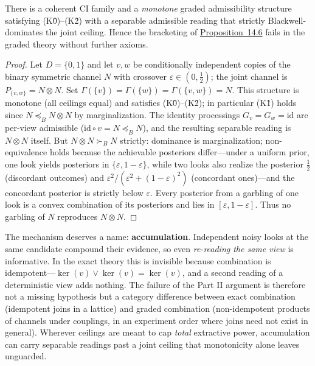 \begin{thmplain}

There is a coherent CI family and a \emph{monotone} graded admissibility structure satisfying (K0̂)--(K2̂) with a separable admissible reading that strictly Blackwell-dominates the joint ceiling. Hence the bracketing of \hyperlink{stmt:14.6}{Proposition~14.6} fails in the graded theory without further axioms.
\end{thmplain}

\begin{proof}

Let \(D = \{0,1\}\) and let \(v, w\) be conditionally independent copies of the binary symmetric channel \(N\) with crossover \(\varepsilon \in (0, \tfrac12)\); the joint channel is \(P_{\{v,w\}} = N \otimes N\). Set \(\Gamma(\{v\}) = \Gamma(\{w\}) = \Gamma(\{v,w\}) = N\). This structure is monotone (all ceilings equal) and satisfies (K0̂)--(K2̂); in particular (K1̂) holds since \(N \preceq_B N \otimes N\) by marginalization. The identity processings \(G_v = G_w = \mathrm{id}\) are per-view admissible (\(\mathrm{id} \circ v = N \preceq_B N\)), and the resulting separable reading is \(N \otimes N\) itself. But \(N \otimes N \succ_B N\) strictly: dominance is marginalization; non-equivalence holds because the achievable posteriors differ---\hspace{0pt}under a uniform prior, one look yields posteriors in \(\{\varepsilon, 1-\varepsilon\}\), while two looks also realize the posterior \(\tfrac12\) (discordant outcomes) and \(\varepsilon^2/(\varepsilon^2 + (1-\varepsilon)^2)\) (concordant ones)---\hspace{0pt}and the concordant posterior is strictly below \(\varepsilon\). Every posterior from a garbling of one look is a convex combination of its posteriors and lies in \([\varepsilon,1-\varepsilon]\). Thus no garbling of \(N\) reproduces \(N\otimes N\).
\end{proof}

The mechanism deserves a name: \textbf{accumulation}. Independent noisy looks at the same candidate compound their evidence, so even \emph{re-reading the same view} is informative. In the exact theory this is invisible because combination is idempotent---\hspace{0pt}\(\ker(v) \vee \ker(v) = \ker(v)\), and a second reading of a deterministic view adds nothing. The failure of the Part II argument is therefore not a missing hypothesis but a category difference between exact combination (idempotent joins in a lattice) and graded combination (non-idempotent products of channels under couplings, in an experiment order where joins need not exist in general). Wherever ceilings are meant to cap \emph{total} extractive power, accumulation can carry separable readings past a joint ceiling that monotonicity alone leaves unguarded.


